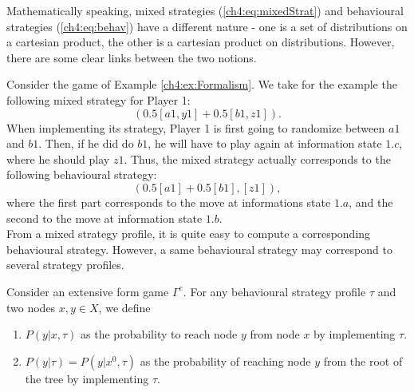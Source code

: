 Mathematically speaking, mixed strategies (\ref{ch4:eq:mixedStrat}) and behavioural strategies (\ref{ch4:eq:behav}) have  a different nature - one is a set of distributions on a cartesian product, the other is a cartesian product on distributions. However, there are some clear links between the two notions.

\begin{example}
Consider the game of Example \ref{ch4:ex:Formalism}.
We take for the example the following mixed strategy for Player 1:
$$( 0.5[a1,y1] + 0.5 [b1,z1] ). $$
When implementing its strategy, Player 1 is first going to randomize between $a1$ and $b1$. Then, if he did do $b1$, he will have to play again at information state $1.c$, where he should play $z1$.
Thus, the mixed strategy actually corresponds to the following behavioural strategy:
$$ (0.5 [a1] + 0.5 [b1], [z1]), $$
where the first part corresponds to the move at informations state $1.a$, and the second to the move at information state $1.b$. \\
From a mixed strategy profile, it is quite easy to compute a corresponding behavioural strategy. However, a same behavioural strategy may correspond to several strategy profiles.
\end{example}



\begin{definition}
Consider an extensive form game $\Gamma^e$. For any behavioural strategy profile $\tau$ and two nodes $x,y \in X$, we define
\begin{enumerate}
\item $P(y | x, \tau)$ as the probability to reach node $y$ from node $x$ by implementing $\tau$.
\item $P(y|\tau) = P(y | x^0, \tau)$ as the probability of reaching node $y$ from the root of the tree by implementing $\tau$.
\end{enumerate}
\end{definition}

